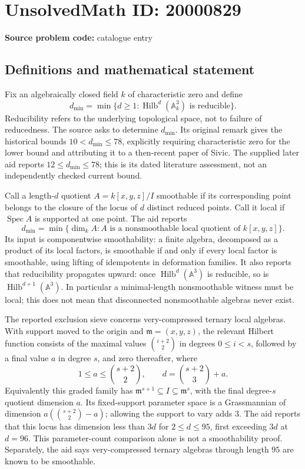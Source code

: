 \documentclass[11pt]{article}
\newcommand{\A}{\mathbb{A}}
\begin{document}
\section*{UnsolvedMath ID: 20000829}
\textbf{Source problem code:} catalogue entry
\subsection{Definitions and mathematical statement}
Fix an algebraically closed field \(k\) of characteristic zero and define
\[
 d_{\min}=\min\{d\ge1:\operatorname{Hilb}^d(\A_k^3)\text{ is reducible}\}.
\]
Reducibility refers to the underlying topological space, not to failure of reducedness. The source asks to determine \(d_{\min}\). Its original remark gives the historical bounds \(10<d_{\min}\le78\), explicitly requiring characteristic zero for the lower bound and attributing it to a then-recent paper of Sivic. The supplied later aid reports \(12\le d_{\min}\le78\); this is its dated literature assessment, not an independently checked current bound.

Call a length-\(d\) quotient \(A=k[x,y,z]/I\) smoothable if its corresponding point belongs to the closure of the locus of \(d\) distinct reduced points. Call it local if \(\operatorname{Spec}A\) is supported at one point. The aid reports
\[
 d_{\min}=\min\{\dim_k A:A\text{ is a nonsmoothable local quotient of }k[x,y,z]\}.
\]
Its input is componentwise smoothability: a finite algebra, decomposed as a product of its local factors, is smoothable if and only if every local factor is smoothable, using lifting of idempotents in deformation families. It also reports that reducibility propagates upward: once \(\operatorname{Hilb}^d(\A^3)\) is reducible, so is \(\operatorname{Hilb}^{d+1}(\A^3)\). In particular a minimal-length nonsmoothable witness must be local; this does not mean that disconnected nonsmoothable algebras never exist.

The reported exclusion sieve concerns very-compressed ternary local algebras. With support moved to the origin and \(\mathfrak m=(x,y,z)\), the relevant Hilbert function consists of the maximal values
\(\binom{i+2}{2}\) in degrees \(0\le i<s\), followed by a final value \(a\) in degree \(s\), and zero thereafter, where
\[
 1\le a\le\binom{s+2}{2},\qquad
 d=\binom{s+2}{3}+a.
\]
Equivalently this graded family has \(\mathfrak m^{s+1}\subseteq I\subseteq\mathfrak m^s\), with the final degree-\(s\) quotient dimension \(a\). Its fixed-support parameter space is a Grassmannian of dimension
\(a(\binom{s+2}{2}-a)\); allowing the support to vary adds \(3\). The aid reports that this locus has dimension less than \(3d\) for \(2\le d\le95\), first exceeding \(3d\) at \(d=96\). This parameter-count comparison alone is not a smoothability proof. Separately, the aid says very-compressed ternary algebras through length \(95\) are known to be smoothable.
\end{document}
